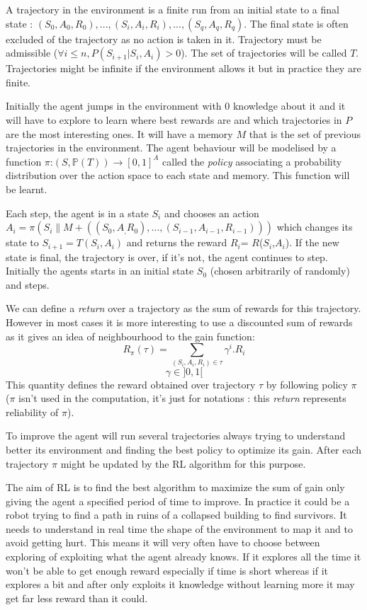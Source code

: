 \documentclass[11pt]{article}
\begin{document}
A trajectory in the environment is a finite run from an initial state to a final state : $(S_0,A_0,R_0),...,(S_i,A_i,R_i),...,(S_q,A_q,R_q)$. The final state is often excluded of the trajectory as no action is taken in it. Trajectory must be admissible ($\forall i\le n,P(S_{i+1}|S_i,A_i) > 0$). The set of trajectories will be called $T$. Trajectories might be infinite if the environment allows it but in practice they are finite.

Initially the agent jumps in the environment with 0 knowledge about it and it will have to explore to learn where best rewards are and which trajectories in $P$ are the most interesting ones. It will have a memory $M$ that is the set of previous trajectories in the environment. The agent behaviour will be modelised by a function $\pi$:$(S,\mathbb{P}(T))\rightarrow [0,1]^A$ called the \emph{policy} associating a probability distribution over the action space to each state and memory. This function will be learnt.

Each step, the agent is in a state $S_i$ and chooses an action $A_{i} = \pi(S_i\|M+((S_0,A_,R_0),...,(S_{i-1},A_{i-1},R_{i-1})))$ which changes its state to $S_{i+1}=T(S_i,A_i)$ and returns the reward $R_i$= $R$($S_i$,$A_i$). If the new state is final, the trajectory is over, if it's not, the agent continues to step. Initially the agents starts in an initial state $S_0$ (chosen arbitrarily of randomly) and steps.

We can define a \emph{return} over a trajectory as the sum of rewards for this trajectory. However in most cases it is more interesting to use a discounted sum of rewards as it gives an idea of neighbourhood to the gain function:
$$ R_{\pi}(\tau) = \sum_{(S_i,A_i,R_i)\in\tau}\gamma^{i}.R_i $$
$$ \gamma \in ]0,1[$$
This quantity defines the reward obtained over trajectory $\tau$ by following policy $\pi$ ($\pi$ isn't used in the computation, it's just for notations : this \emph{return} represents reliability of $\pi$).


To improve the agent will run several trajectories always trying to understand better its environment and finding the best policy to optimize its gain. After each trajectory $\pi$ might be updated by the RL algorithm for this purpose.

The aim of RL is to find the best algorithm to maximize the sum of gain only giving the agent a specified period of time to improve. In practice it could be a robot trying to find a path in ruins of a collapsed building to find survivors. It needs to understand in real time the shape of the environment to map it and to avoid getting hurt. This means it will very often have to choose between exploring of exploiting what the agent already knows. If it explores all the time it won't be able to get enough reward especially if time is short whereas if it explores a bit and after only exploits it knowledge without learning more it may get far less reward than it could.
\end{document}
